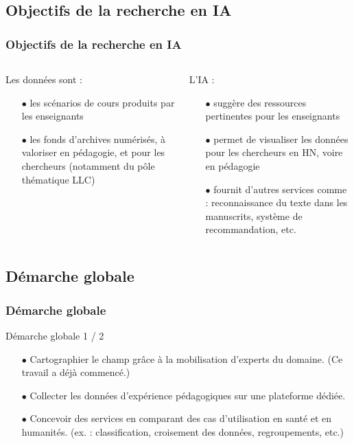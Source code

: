 \documentclass[xcolor=dvipsnames]{beamer}
\begin{document}
\subsection{Objectifs de la recherche en IA
}
\begin{frame}[fragile]
\frametitle{Objectifs de la recherche en IA
}
\begin{columns}
	\begin{block}{Les données sont :}
		\small{
		\begin{itemize}
			\item[$\bullet$]les scénarios de cours produits par les enseignants
			\item[$\bullet$]les fonds d'archives numérisés, à valoriser en pédagogie, et pour les chercheurs (notamment du pôle thématique LLC)
		\end{itemize}}
	\end{block}
\vspace{4cm}
	\begin{block}{L'IA :}
		\small{
		\begin{itemize}
		\item[$\bullet$]suggère des ressources pertinentes pour les enseignants
		\item[$\bullet$]permet de visualiser les données pour les chercheurs en HN, voire en pédagogie
		\item[$\bullet$]fournit d'autres services comme : reconnaissance du texte dans les manuscrits, système de recommandation, etc.
		\end{itemize}}
	\end{block}
\vspace{2.5cm}
\end{columns}
\end{frame}

\subsection{Démarche globale}
\begin{frame}[fragile]
\frametitle{Démarche globale}
\begin{block}{Démarche globale 1 / 2}
	\begin{itemize}
		\item[$\bullet$]Cartographier le champ grâce à la mobilisation d'experts du domaine. (Ce travail a déjà commencé.)
		\item[$\bullet$]Collecter les données d'expérience pédagogiques sur une plateforme dédiée.
		\item[$\bullet$]Concevoir des services en comparant des cas d'utilisation en santé et en humanités. (ex. : classification, croisement des données, regroupements, etc.)
	\end{itemize}
\end{block}
\vspace{2cm}
\end{frame}
\end{document}
